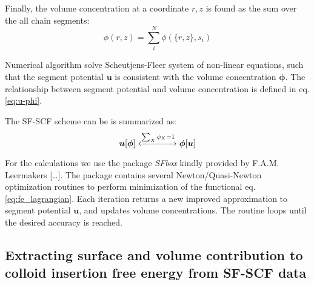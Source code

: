 \documentclass[10pt, a4paper]{article}
\begin{document}
\begin{multicols}{2}
Finally, the volume concentration at a coordinate $r, z$ is found as the sum over the all chain segments:
\begin{equation}
    \phi(r, z) = \sum_{i}^{N} \phi(\{r, z\}, s_{i})
\end{equation}

Numerical algorithm solve Scheutjens-Fleer system of non-linear equations, such that the segment potential $\mathbf{u}$ is consistent with the volume concentration $\mathbf{\phi}$.
The relationship between segment potential and volume concentration is defined in eq. \ref{eq:u-phi}.

The SF-SCF scheme can be is summarized as:
\begin{equation}
    \bm{u}[\bm{\phi}] \xleftrightarrow[]{\sum_{X} \phi_X = 1} \bm{\phi}[\bm{u}]
\end{equation}

For the calculations we use the package \emph{SFbox} kindly provided by F.A.M. Leermakers [\dots].
The package contains several Newton/Quasi-Newton optimization routines to perform minimization of the functional eq.\ref{eq:fe_lagrangian}.
Each iteration returns a new improved approximation to segment potential $\mathbf{u}$, and updates volume concentrations.
The routine loops until the desired accuracy is reached.

\end{multicols}
\subsection*{Extracting surface and volume contribution to colloid insertion free energy from SF-SCF data}
\end{document}

